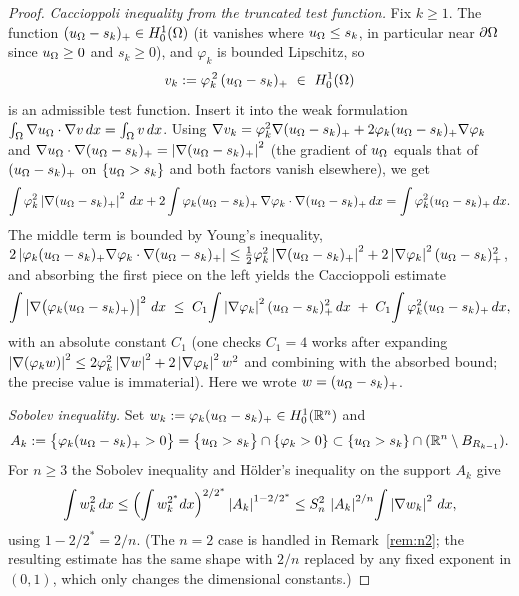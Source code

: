 \begin{proof}
\smallskip
\emph{Caccioppoli inequality from the truncated test function.}
Fix $k\ge1$. The function $(u_\Omega-s_k)_+\in H^1_0(\Omega)$ (it vanishes
where $u_\Omega\le s_k$, in particular near $\partial\Omega$ since $u_\Omega\ge0$
and $s_k\ge0$), and $\varphi_k$ is bounded Lipschitz, so
\[
   v_k:=\varphi_k^{\,2}\,(u_\Om-s_k)_+\ \in\ H^1_0(\Om)
\]
is an admissible test function. Insert it into the weak formulation
$\int_\Omega\nabla u_\Omega\cdot\nabla v\,dx=\int_\Omega v\,dx$. Using
$\nabla v_k=\varphi_k^2\nabla(u_\Omega-s_k)_+
+2\varphi_k(u_\Omega-s_k)_+\nabla\varphi_k$ and
$\nabla u_\Omega\cdot\nabla(u_\Omega-s_k)_+=\left|\nabla(u_\Omega-s_k)_+\right|^2$ (the
gradient of $u_\Omega$ equals that of $(u_\Omega-s_k)_+$ on $\{u_\Omega>s_k\}$ and
both factors vanish elsewhere), we get
\[
   \int\varphi_k^2\left|\nabla(u_\Omega-s_k)_+\right|^2\,dx
   +2\int\varphi_k(u_\Omega-s_k)_+\,\nabla\varphi_k\cdot\nabla(u_\Omega-s_k)_+\,dx
   =\int\varphi_k^2(u_\Omega-s_k)_+\,dx .
\]
The middle term is bounded by Young's inequality,
$2\left|\varphi_k(u_\Omega-s_k)_+\nabla\varphi_k\cdot\nabla(u_\Omega-s_k)_+\right|
\le\tfrac12\varphi_k^2\left|\nabla(u_\Omega-s_k)_+\right|^2
+2\left|\nabla\varphi_k\right|^2(u_\Omega-s_k)_+^2$,
and absorbing the first piece on the left yields the Caccioppoli
estimate
\begin{equation}\label{eq:caccioppoli}
   \int\left|\nabla\bigl(\varphi_k(u_\Omega-s_k)_+\bigr)\right|^2\,dx
   \;\le\;C_1\!\int\left|\nabla\varphi_k\right|^2(u_\Omega-s_k)_+^2\,dx
        \;+\;C_1\!\int\varphi_k^2(u_\Omega-s_k)_+\,dx,
\end{equation}
with an absolute constant $C_1$ (one checks $C_1=4$ works after expanding
$\left|\nabla(\varphi_k w)\right|^2\le2\varphi_k^2\left|\nabla w\right|^2
+2\left|\nabla\varphi_k\right|^2 w^2$ and combining with the absorbed bound; the
precise value is immaterial). Here we wrote $w=(u_\Omega-s_k)_+$.

\smallskip
\emph{Sobolev inequality.} Set
$w_k:=\varphi_k(u_\Omega-s_k)_+\in H^1_0(\mathbb{R}^n)$ and
\[
   A_k:=\bigl\{\varphi_k(u_\Omega-s_k)_+>0\bigr\}
       =\bigl\{u_\Omega>s_k\bigr\}\cap\{\varphi_k>0\}
       \subset\{u_\Omega>s_k\}\cap(\mathbb{R}^n\setminus B_{R_{k-1}}).
\]
For $n\ge3$ the Sobolev inequality and Hölder's inequality on the support
$A_k$ give
\begin{equation}\label{eq:sobolev}
   \int w_k^2\,dx
   \le\Bigl(\int w_k^{2^*}dx\Bigr)^{2/2^*}\left|A_k\right|^{1-2/2^*}
   \le S_n^2\,\left|A_k\right|^{2/n}\!\int\left|\nabla w_k\right|^2\,dx,
\end{equation}
using $1-2/2^*=2/n$. (The $n=2$ case is handled in
Remark~\ref{rem:n2}; the resulting estimate has the same shape with $2/n$
replaced by any fixed exponent in $(0,1)$, which only changes the
dimensional constants.)


\end{proof}
